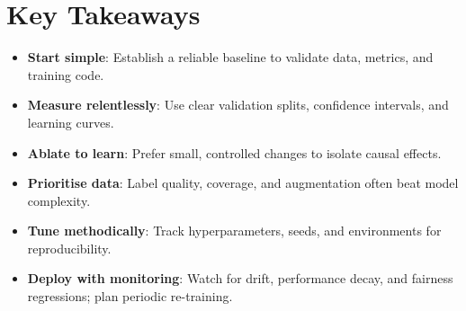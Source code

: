
\section*{Key Takeaways}

\begin{keytakeaways}
\begin{itemize}[leftmargin=2em]
    \item \textbf{Start simple}: Establish a reliable baseline to validate data, metrics, and training code.
    \item \textbf{Measure relentlessly}: Use clear validation splits, confidence intervals, and learning curves.
    \item \textbf{Ablate to learn}: Prefer small, controlled changes to isolate causal effects.
    \item \textbf{Prioritise data}: Label quality, coverage, and augmentation often beat model complexity.
    \item \textbf{Tune methodically}: Track hyperparameters, seeds, and environments for reproducibility.
    \item \textbf{Deploy with monitoring}: Watch for drift, performance decay, and fairness regressions; plan periodic re-training.
\end{itemize}
\end{keytakeaways}


